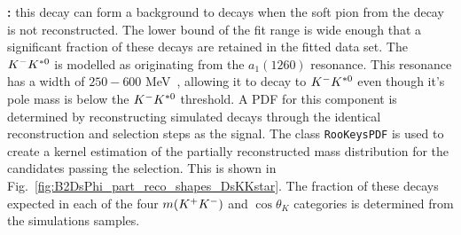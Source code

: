 
\begin{description}
\item \textbf{\decay{\Bsb}{\Dsp\Km\Kstarz}:} this decay can form a background to \decay{\Bp}{\Dsp\phiz} decays when the soft pion from the \decay{\Kstarz}{\Kp\pim} decay is not reconstructed. The lower bound of the fit range is wide enough that a significant fraction of these decays are retained in the fitted data set. The ${{K}^-}{{K}^{*0}}$ is modelled as originating from the $a_1(1260)$ resonance. This resonance has a width of $250-600$ MeV~\cite{PDG2016}, allowing it to decay to ${{K}^-}{{K}^{*0}}$ even though it's pole mass is below the ${{K}^-}{{K}^{*0}}$ threshold. A PDF for this component is determined by reconstructing simulated \decay{\Bsb}{\Dsp\Km\Kstarz} decays through the identical reconstruction and selection steps as the signal. The \roofit class \texttt{RooKeysPDF} is used to create a kernel estimation of the partially reconstructed \Bp mass distribution for the candidates passing the selection. This is shown in Fig.~\ref{fig:B2DsPhi_part_reco_shapes_DsKKstar}. The fraction of these decays expected in each of the four $m({{K}^+}{{K}^-})$ and $\cos\theta_{K}$ categories is determined from the simulations samples.
\end{description}

